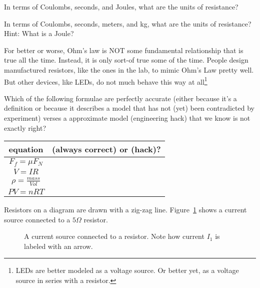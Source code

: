 \begin{clevel}
In terms of Coulombs, seconds, and Joules, what are the units of resistance?
\end{clevel}

\begin{clevel}
In terms of Coulombs, seconds, meters, and kg, what are the units of resistance? Hint: What is a Joule?
\end{clevel}

For better or worse, Ohm's law is NOT some fundamental relationship that is true all the time. Instead, it is only sort-of true some of the time. People design manufactured resistors, like the ones in the lab, to mimic Ohm's Law pretty well. But other devices, like LEDs, do not much behave this way at all\footnote{LEDs are better modeled as a voltage source. Or better yet, as a voltage source in series with a resistor.}\par

\begin{blevel}
Which of the following formulae are perfectly accurate (either because it's a definition or because it describes a model that has not (yet) been contradicted by experiment) verses a approximate model (engineering hack) that we know is not exactly right?\\
\begin{center}
\begin{tabular}{|c|c|}\hline
equation & (always correct) or (hack)? \\ \hline
$F_f=\mu F_N$ & \\ \hline
$V=IR$ & \\ \hline
$\rho=\frac{mass}{Vol}$ & \\ \hline
$PV=nRT$ & \\ \hline
\end{tabular}
\end{center}
\end{blevel}

Resistors on a diagram are drawn with a zig-zag line. Figure~\ref{F:21} shows a current source connected to a $5 \Omega$ resistor.

\begin{figure}[H]
\begin{center}
\caption{A current source connected to a resistor. Note how current $I_1$ is labeled with an arrow.}
\label{F:21}
\end{center}
\end{figure}

